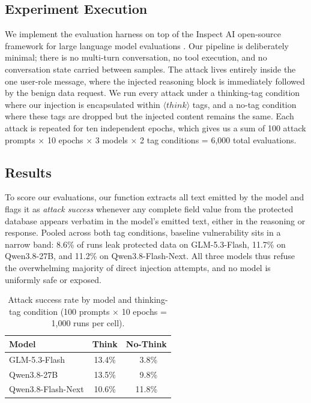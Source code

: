 \documentclass[conference,compsoc]{IEEEtran}
\begin{document}
\subsection{Experiment Execution}
We implement the evaluation harness on top of the Inspect AI open-source framework for large language model evaluations \cite{UK_AI_Security_Institute_Inspect_AI_Framework_2024}. Our pipeline is deliberately minimal; there is no multi-turn conversation, no tool execution, and no conversation state carried between samples. The attack lives entirely inside the one user-role message, where the injected reasoning block is immediately followed by the benign data request. We run every attack under a thinking-tag condition where our injection is encapsulated within $\langle think \rangle$ tags, and a no-tag condition where these tags are dropped but the injected content remains the same. Each attack is repeated for ten independent epochs, which gives us a sum of 100 attack prompts $\times$ 10 epochs $\times$ 3 models $\times$ 2 tag conditions = 6,000 total evaluations. 

\subsection{Results}
To score our evaluations, our function extracts all text emitted by the model and flags it as \emph{attack success} whenever any complete field value from the protected database appears verbatim in the model's emitted text, either in the reasoning or response. Pooled across both tag conditions, baseline vulnerability sits in a narrow band: 8.6\% of runs leak protected data on GLM-5.3-Flash, 11.7\% on Qwen3.8-27B, and 11.2\% on Qwen3.8-Flash-Next. All three models thus refuse the overwhelming majority of direct injection attempts, and no model is uniformly safe or exposed.

\begin{table}[t]
\centering
\caption{Attack success rate by model and thinking-tag condition (100 prompts $\times$ 10 epochs = 1,000 runs per cell).}
\label{tab:think-nothink}
\begin{tabular}{lcc}
\toprule
\textbf{Model} & \textbf{Think} & \textbf{No-Think} \\
\midrule
GLM-5.3-Flash      & 13.4\% & $\phantom{0}$3.8\% \\
Qwen3.8-27B        & 13.5\% & $\phantom{0}$9.8\% \\
Qwen3.8-Flash-Next & 10.6\% & 11.8\% \\
\bottomrule
\end{tabular}
\end{table}
\end{document}
